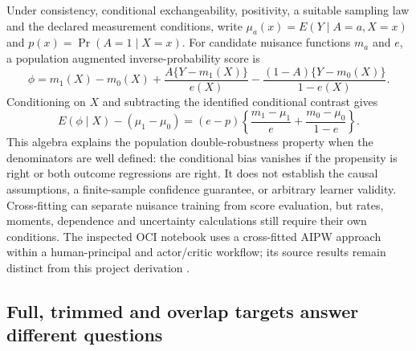 Under consistency, conditional exchangeability, positivity, a suitable sampling
law and the declared measurement conditions, write
$\mu_a(x)=E(Y\mid A=a,X=x)$ and $p(x)=\Pr(A=1\mid X=x)$. For candidate nuisance
functions $m_a$ and $e$, a population augmented inverse-probability score is
\[
 \phi=m_1(X)-m_0(X)+\frac{A\{Y-m_1(X)\}}{e(X)}
       -\frac{(1-A)\{Y-m_0(X)\}}{1-e(X)}.
\]
Conditioning on $X$ and subtracting the identified conditional contrast gives
\begin{equation}
 E(\phi\mid X)-(\mu_1-\mu_0)
 =(e-p)\left\{\frac{m_1-\mu_1}{e}
               +\frac{m_0-\mu_0}{1-e}\right\}.
 \label{exec14:aipw-remainder}
\end{equation}
This algebra explains the population double-robustness property when the
denominators are well defined: the conditional bias vanishes if the propensity
is right or both outcome regressions are right. It does not establish the causal
assumptions, a finite-sample confidence guarantee, or arbitrary learner validity.
Cross-fitting can separate nuisance training from score evaluation, but rates,
moments, dependence and uncertainty calculations still require their own
conditions. The inspected OCI notebook uses a cross-fitted AIPW approach within
a human-principal and actor/critic workflow; its source results remain distinct
from this project derivation \citep{v12_la_2607_22443,exec14_estimation_sources}.

\subsection{Full, trimmed and overlap targets answer different questions}

